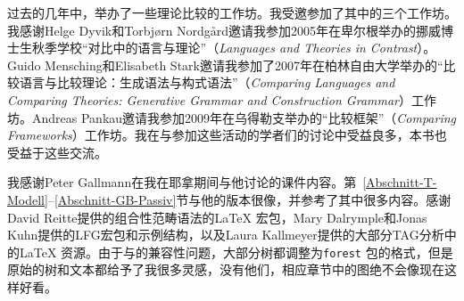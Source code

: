 过去的几年中，举办了一些理论比较的工作坊。我受邀参加了其中的三个工作坊。我感谢Helge Dyvik和Torbjørn Nordgård邀请我参加2005年在卑尔根举办的挪威博士生秋季学校“对比中的语言与理论”（\emph{Languages and Theories in Contrast}）。Guido Mensching和Elisabeth
Stark邀请我参加了2007年在柏林自由大学举办的“比较语言与比较理论：生成语法与构式语法”（\emph{Comparing Languages and Comparing Theories:
  Generative Grammar and Construction Grammar}）工作坊。Andreas Pankau邀请我参加2009年在乌得勒支举办的“比较框架”（\emph{Comparing
  Frameworks}）工作坊。我在与参加这些活动的学者们的讨论中受益良多，本书也受益于这些交流。

我感谢Peter Gallmann在我在耶拿期间与他讨论的课件内容。第~\ref{Abschnitt-T-Modell}--\ref{Abschnitt-GB-Passiv}节与他的版本很像，并参考了其中很多内容。感谢David Reitte提供的组合性范畴语法的\LaTeX{} 宏包，Mary Dalrymple和Jonas Kuhn提供的LFG宏包和示例结构，以及Laura Kallmeyer提供的大部分TAG分析中的\LaTeX{} 资源。由于与\XeLaTeX 的兼容性问题，大部分树都调整为\texttt{forest} 包的格式，但是原始的树和文本都给予了我很多灵感，没有他们，相应章节中的图绝不会像现在这样好看。

